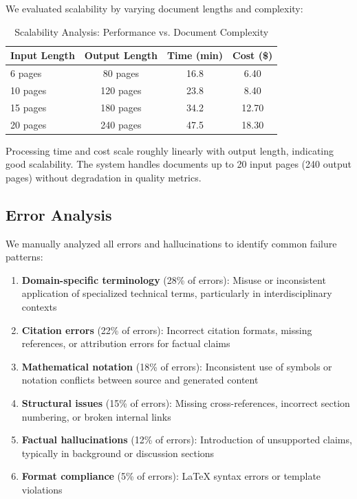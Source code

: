 \documentclass{ieeeaccess}
\begin{document}
We evaluated scalability by varying document lengths and complexity:

\begin{table}[!t]
\caption{Scalability Analysis: Performance vs. Document Complexity}
\label{tab:scalability}
\centering
\renewcommand{\arraystretch}{1.3}
\small
\begin{tabular}{lccc}
\toprule
\textbf{Input Length} & \textbf{Output Length} & \textbf{Time (min)} & \textbf{Cost (\$)} \\
\midrule
6 pages & 80 pages & 16.8 & 6.40 \\
10 pages & 120 pages & 23.8 & 8.40 \\
15 pages & 180 pages & 34.2 & 12.70 \\
20 pages & 240 pages & 47.5 & 18.30 \\
\bottomrule
\end{tabular}
\normalsize
\end{table}

Processing time and cost scale roughly linearly with output length, indicating good scalability. The system handles documents up to 20 input pages (240 output pages) without degradation in quality metrics.

\subsection{Error Analysis}

We manually analyzed all errors and hallucinations to identify common failure patterns:

\begin{enumerate}
\item \textbf{Domain-specific terminology} (28\% of errors): Misuse or inconsistent application of specialized technical terms, particularly in interdisciplinary contexts

\item \textbf{Citation errors} (22\% of errors): Incorrect citation formats, missing references, or attribution errors for factual claims

\item \textbf{Mathematical notation} (18\% of errors): Inconsistent use of symbols or notation conflicts between source and generated content

\item \textbf{Structural issues} (15\% of errors): Missing cross-references, incorrect section numbering, or broken internal links

\item \textbf{Factual hallucinations} (12\% of errors): Introduction of unsupported claims, typically in background or discussion sections

\item \textbf{Format compliance} (5\% of errors): LaTeX syntax errors or template violations
\end{enumerate}
\end{document}
